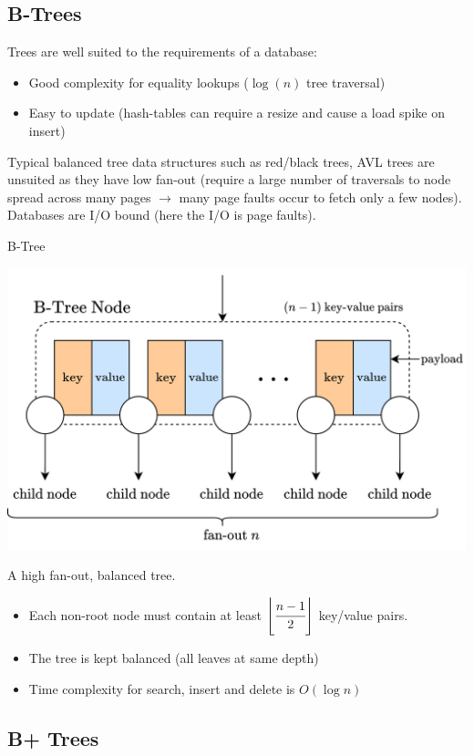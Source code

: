 \subsection{B-Trees}
Trees are well suited to the requirements of a database:
\begin{itemize}
    \item Good complexity for equality lookups ($\log(n)$ tree traversal)
    \item Easy to update (hash-tables can require a resize and cause a load spike on insert)
\end{itemize}
Typical balanced tree data structures such as red/black trees, AVL trees are unsuited as they have low fan-out (require a large number of traversals to node spread across many pages $\to$ many page faults occur to fetch only a few nodes). Databases are I/O bound (here the I/O is page faults).

\begin{definitionbox}{B-Tree}
    \begin{center}
        \includegraphics[width=.8\textwidth]{algorithms_and_indices/images/b_tree_node.drawio.png}
    \end{center}
    A high fan-out, balanced tree.
    \begin{itemize}
        \item Each non-root node must contain at least $\left\lfloor \cfrac{n-1}{2} \right\rfloor$ key/value pairs.
        \item The tree is kept balanced (all leaves at same depth)
        \item Time complexity for search, insert and delete is $O(\log n)$
    \end{itemize}
\end{definitionbox}

\subsection{B+ Trees}
\unfinished

